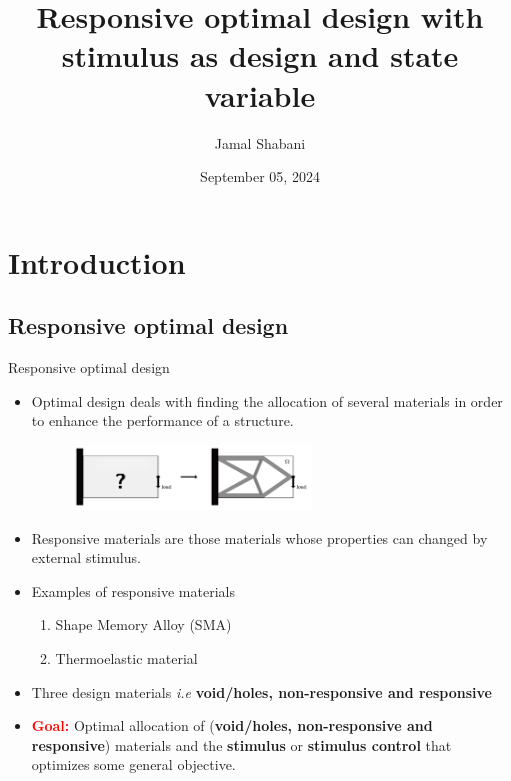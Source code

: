 \documentclass{beamer}
\title[]{Responsive optimal design with stimulus as design and state variable} %
\author{Jamal Shabani} %
\institute[] %
{
    McMaster University \\ %
    \medskip
    \textit{PhD Defence} %
}
\date{September 05, 2024} %
\begin{document}
\begin{frame}
\titlepage %
\end{frame}


\section{Introduction}
\subsection{Responsive optimal design}
\begin{frame}{Responsive optimal design}
\begin{itemize}
    \item Optimal design deals with finding the allocation of several materials in order to enhance the performance of a structure.
    \begin{figure}[h]
        \centering
        \includegraphics[width=0.6\textwidth]{figures/minimum.png}
    \end{figure}
    \item Responsive materials are those materials whose properties can changed by external stimulus.
    \item Examples of responsive materials
    \begin{enumerate}
        \item Shape Memory Alloy (SMA)
        \item Thermoelastic material
    \end{enumerate} 
    \item Three design materials \emph{i.e} {\bf void/holes, non-responsive and responsive}
    \item \textcolor{red}{\bf Goal:} Optimal allocation of ({\bf void/holes, non-responsive and responsive}) 
    materials and the {\bf stimulus} or {\bf stimulus control} that optimizes some general objective.
\end{itemize}
\end{frame} 
\end{document}
